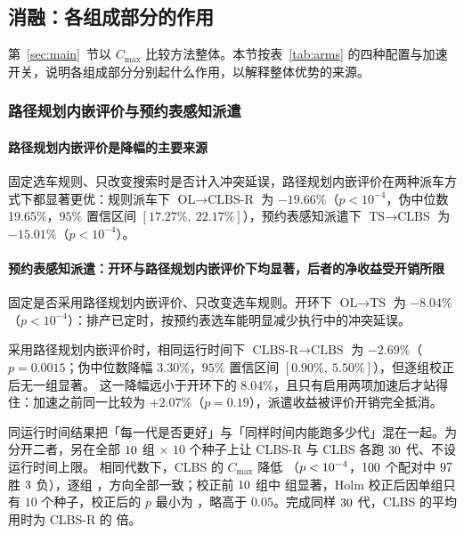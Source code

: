 \documentclass[manuscript,screen,review]{acmart}
\newcommand{\GainLoopRule}{19.66\%}      %
\newcommand{\PLoopRule}{<10^{-4}}
\newcommand{\GainLoopProbe}{15.01\%}     %
\newcommand{\PLoopProbe}{<10^{-4}}
\newcommand{\GainProbeOpen}{8.04\%}      %
\newcommand{\PProbeOpen}{<10^{-4}}
\newcommand{\GainProbeLoop}{2.69\%}      %
\newcommand{\PProbeLoop}{=0.0015}
\newcommand{\GainProbeLoopPre}{+2.07\%}  %
\newcommand{\PProbeLoopPre}{=0.19}
\newcommand{\HLLoopRule}{19.65\%}
\newcommand{\CILoopRule}{$[17.27\%,\ 22.17\%]$}
\newcommand{\HLProbeLoop}{3.30\%}
\newcommand{\CIProbeLoop}{$[0.90\%,\ 5.50\%]$}
\begin{document}
\subsection{消融：各组成部分的作用}
\label{sec:ablation}

第~\ref{sec:main}~节以 $C_{\max}$ 比较方法整体。本节按表~\ref{tab:arms} 的四种配置与加速开关，说明各组成部分分别起什么作用，以解释整体优势的来源。

\subsubsection{路径规划内嵌评价与预约表感知派遣}
\label{sec:complement}

\paragraph{路径规划内嵌评价是降幅的主要来源}
固定选车规则、只改变搜索时是否计入冲突延误，路径规划内嵌评价在两种派车方式下都显著更优：规则派车下 $\text{OL}\to\text{CLBS-R}$ 为 $-\GainLoopRule$（$p\PLoopRule$，伪中位数 \HLLoopRule{}，$95\%$ 置信区间 \CILoopRule{}），预约表感知派遣下 $\text{TS}\to\text{CLBS}$ 为 $-\GainLoopProbe$（$p\PLoopProbe$）。

\paragraph{预约表感知派遣：开环与路径规划内嵌评价下均显著，后者的净收益受开销所限}
固定是否采用路径规划内嵌评价、只改变选车规则。开环下 $\text{OL}\to\text{TS}$ 为 $-\GainProbeOpen$（$p\PProbeOpen$）：排产已定时，按预约表选车能明显减少执行中的冲突延误。

采用路径规划内嵌评价时，相同运行时间下 $\text{CLBS-R}\to\text{CLBS}$ 为 $-\GainProbeLoop$（$p\PProbeLoop$；伪中位数降幅 \HLProbeLoop{}，$95\%$ 置信区间 \CIProbeLoop{}），但逐组校正后无一组显著。
这一降幅远小于开环下的 \GainProbeOpen{}，且只有启用两项加速后才站得住：加速之前同一比较为 $\GainProbeLoopPre$（$p\PProbeLoopPre$），派遣收益被评价开销完全抵消。

同运行时间结果把「每一代是否更好」与「同样时间内能跑多少代」混在一起。为分开二者，另在全部 $10$ 组 $\times$ $10$ 个种子上让 CLBS-R 与 CLBS 各跑 $30$ 代、不设运行时间上限。
相同代数下，CLBS 的 $C_{\max}$ 降低 \SameGenGainAbs{}（$p<10^{-4}$，$100$ 个配对中 $97$ 胜 $3$ 负），逐组 \SameGenRange{}，方向全部一致；校正前 $10$ 组中 \SameGenSigRaw{} 组显著，Holm 校正后因单组只有 $10$ 个种子，校正后的 $p$ 最小为 \SameGenHolmMin{}，略高于 $0.05$。完成同样 $30$ 代，CLBS 的平均用时为 CLBS-R 的 \SameGenTimeRatio{} 倍。
\end{document}
